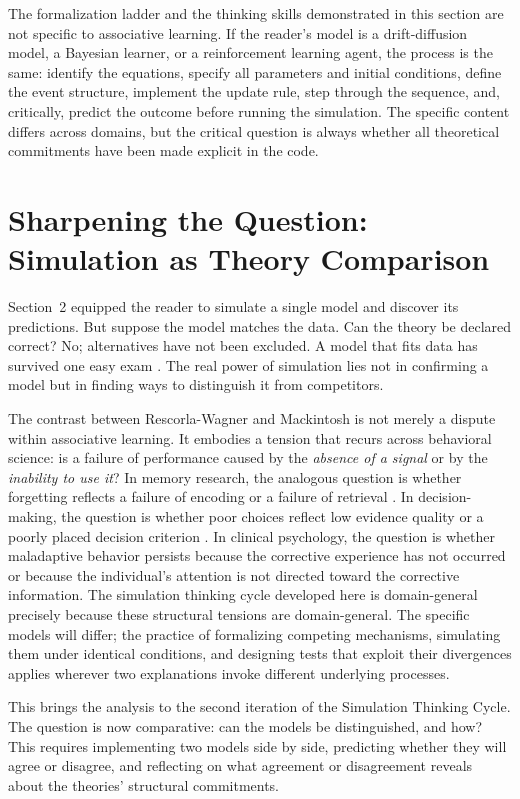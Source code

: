\documentclass[fleqn,10pt]{wlscirep}
\begin{document}
\begin{linenumbers}
The formalization ladder and the thinking skills demonstrated in this section are not specific to associative learning. If the reader's model is a drift-diffusion model, a Bayesian learner, or a reinforcement learning agent, the process is the same: identify the equations, specify all parameters and initial conditions, define the event structure, implement the update rule, step through the sequence, and, critically, predict the outcome before running the simulation. The specific content differs across domains, but the critical question is always whether all theoretical commitments have been made explicit in the code.

\section{Sharpening the Question: Simulation as Theory Comparison}

Section~2 equipped the reader to simulate a single model and discover its predictions. But suppose the model matches the data. Can the theory be declared correct? No; alternatives have not been excluded. A model that fits data has survived one easy exam \citep{roberts2000persuasive}. The real power of simulation lies not in confirming a model but in finding ways to distinguish it from competitors.

The contrast between Rescorla-Wagner and Mackintosh is not merely a dispute within associative learning. It embodies a tension that recurs across behavioral science: is a failure of performance caused by the \emph{absence of a signal} or by the \emph{inability to use it}? In memory research, the analogous question is whether forgetting reflects a failure of encoding or a failure of retrieval \citep{tulving1973encoding}. In decision-making, the question is whether poor choices reflect low evidence quality or a poorly placed decision criterion \citep{ratcliff2008diffusion}. In clinical psychology, the question is whether maladaptive behavior persists because the corrective experience has not occurred or because the individual's attention is not directed toward the corrective information. The simulation thinking cycle developed here is domain-general precisely because these structural tensions are domain-general. The specific models will differ; the practice of formalizing competing mechanisms, simulating them under identical conditions, and designing tests that exploit their divergences applies wherever two explanations invoke different underlying processes.

This brings the analysis to the second iteration of the Simulation Thinking Cycle. The question is now comparative: can the models be distinguished, and how? This requires implementing two models side by side, predicting whether they will agree or disagree, and reflecting on what agreement or disagreement reveals about the theories' structural commitments.


\end{linenumbers}
\end{document}
